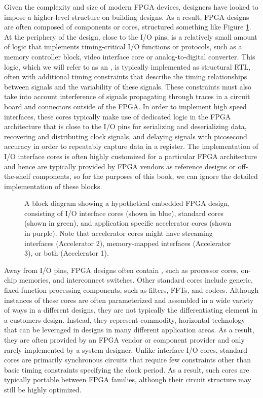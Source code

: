 Given the complexity and size of modern FPGA devices, designers have looked to impose a higher-level structure on building designs.  As a result, FPGA designs are often composed of components or \glspl{core}, structured something like Figure \ref{fig:designTemplate}.  At the periphery of the design, close to the I/O pins, is a relatively small amount of logic that implements timing-critical I/O functions or protocols, such as a memory controller block, video interface core or analog-to-digital converter.  This logic, which we will refer to as an , is typically implemented as structural RTL, often with additional timing constraints that describe the timing relationships between signals and the variability of these signals.   These constraints must also take into account interference of signals propagating through traces in a circuit board and connectors outside of the FPGA.  In order to implement high speed interfaces, these cores typically make use of dedicated logic in the FPGA architecture that is close to the I/O pins for serializing and deserializing data, recovering and distributing clock signals, and delaying signals with picosecond accuracy in order to repeatably capture data in a register.  The implementation of I/O interface cores is often highly customized for a particular FPGA architecture and hence are typically provided by FPGA vendors as reference designs or off-the-shelf components, so for the purposes of this book, we can ignore the detailed implementation of these blocks.

\begin{figure}
\centering
\def\svgwidth{\columnwidth}

\caption{A block diagram showing a hypothetical embedded FPGA design, consisting of I/O interface cores (shown in blue), standard cores (shown in green), and application specific accelerator cores (shown in purple).  Note that accelerator cores might have streaming interfaces (Accelerator 2), memory-mapped interfaces (Accelerator 3), or both (Accelerator 1). }
\label{fig:designTemplate}
\end{figure}

Away from I/O pins, FPGA designs often contain , such as processor cores, on-chip memories, and interconnect switches.   Other standard cores include generic, fixed-function processing components, such as filters, FFTs, and codecs.  Although instances of these cores are often parameterized and assembled in a wide variety of ways in a different designs, they are not typically the differentiating element in a customers design.  Instead, they represent commodity, horizontal technology that can be leveraged in designs in many different application areas.   As a result, they are often provided by an FPGA vendor or component provider and only rarely implemented by a system designer.  Unlike interface I/O cores, standard cores are primarily synchronous circuits that require few constraints other than basic timing constraints specifying the clock period.  As a result, such cores are typically portable between FPGA families, although their circuit structure may still be highly optimized.

